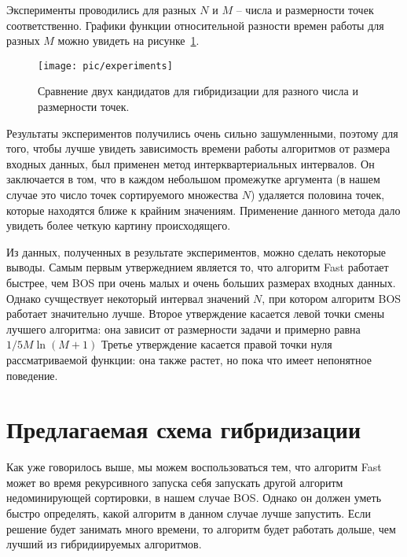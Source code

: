 Эксперименты проводились для разных $N$ и $M$ -- числа и размерности точек соответственно. Графики функции относительной разности времен работы для разных $M$ можно увидеть на рисунке~\ref{experiment}.

\begin{figure}
\begin{center}
\texttt{[image: pic/experiments]}
\caption{Сравнение двух кандидатов для гибридизации для разного числа и размерности точек.}
\label{experiment}
\end{center}
\end{figure}

Результаты экспериментов получились очень сильно зашумленными, поэтому для того, чтобы лучше увидеть зависимость времени работы алгоритмов от размера входных данных, был применен метод интерквартериальных интервалов. Он заключается в том, что в каждом небольшом промежутке аргумента (в нашем случае это число точек сортируемого множества $N$) удаляется половина точек, которые находятся ближе к крайним значениям. Применение данного метода дало увидеть более четкую картину происходящего.

Из данных, полученных в результате экспериментов, можно сделать некоторые выводы. Самым первым утвержеднием является то, что алгоритм Fast работает быстрее, чем BOS при очень малых и очень больших размерах входных данных. Однако сучществует некоторый интервал значений $N$, при котором алгоритм BOS работает значительно лучше. Второе утверждение касается левой точки смены лучшего алгоритма: она зависит от размерности задачи и примерно равна $1/5 M \ln (M + 1)$
Третье утверждение касается правой точки нуля рассматриваемой функции: она также растет, но пока что имеет непонятное поведение.




\section{Предлагаемая схема гибридизации}

Как уже говорилось выше, мы можем воспользоваться тем, что алгоритм Fast может во время рекурсивного запуска себя запускать другой алгоритм недоминирующей сортировки, в нашем случае BOS. Однако он должен уметь быстро определять, какой алгоритм в данном случае лучше запустить. Если решение будет занимать много времени, то алгоритм будет работать дольше, чем лучший из гибридиируемых алгоритмов.

